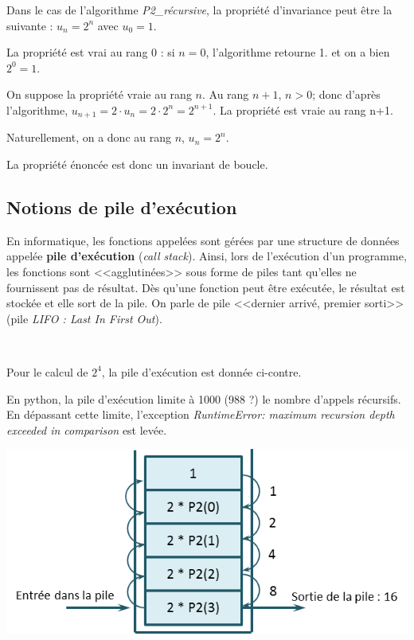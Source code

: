 \documentclass[10pt,fleqn]{article} %
\begin{document}
\begin{exemple}
Dans le cas de l'algorithme \textsl{P2\_récursive}, la propriété d'invariance peut être la suivante : $u_n = 2^n$ avec $u_0 = 1$. 

La propriété est vrai au rang 0 : si $n=0$, l'algorithme retourne 1. et on a bien $2^0=1$.

On suppose la propriété vraie au rang $n$. Au rang $n+1$, $n>0$; donc d'après l'algorithme, $u_{n+1}=2\cdot u_n =2\cdot 2^n = 2^{n+1}$. La propriété est vraie au rang n+1.

Naturellement, on a donc au rang $n$, $u_n = 2^n$. 

La propriété énoncée est donc un invariant de boucle.
\end{exemple}
\subsection{Notions de pile d'exécution}
En informatique, les fonctions appelées sont gérées par une structure de données appelée \textbf{pile d'exécution} (\textit{call stack}). Ainsi, lors de l'exécution d'un programme, les fonctions sont <<agglutinées>> sous forme de piles tant qu'elles ne fournissent pas de résultat.
Dès qu'une fonction peut être exécutée, le résultat est stockée et elle sort de la pile. On parle de pile <<dernier arrivé, premier sorti>> (pile \textit{LIFO : Last In First Out}).

\begin{exemple}
~\\

\begin{minipage}[c]{.57\linewidth}
Pour le calcul de $2^4$, la pile d'exécution est donnée ci-contre. 
\begin{rem}
En python, la pile d'exécution limite à 1000 (988 ?) le nombre d'appels récursifs. En dépassant cette limite, l'exception \textsl{RuntimeError: maximum recursion depth exceeded in comparison
} est levée.
\end{rem}
\end{minipage} \hfill
\begin{minipage}[c]{.4\linewidth}
\begin{center}
\includegraphics[width=\linewidth]{images/pile}
\end{center} 
\end{minipage}
\end{exemple}
\end{document}
